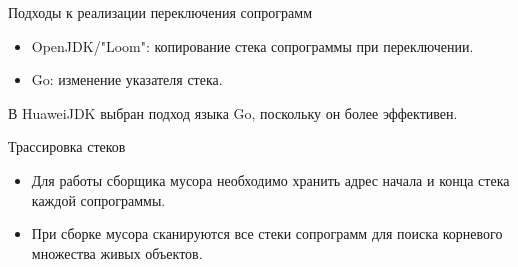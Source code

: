 \begin{frame}{Подходы к реализации переключения сопрограмм}
	\begin{itemize}
		\item OpenJDK/"Loom": копирование стека сопрограммы при переключении.
		\item Go: изменение указателя стека.
	\end{itemize}

	В HuaweiJDK выбран подход языка Go, поскольку он более эффективен.
\end{frame}

\begin{frame}{Трассировка стеков}
	\begin{itemize}
		\item Для работы сборщика мусора необходимо хранить адрес начала и конца стека каждой сопрограммы.
		\item При сборке мусора сканируются все стеки сопрограмм для поиска корневого множества живых объектов.
	\end{itemize}
\end{frame}	

